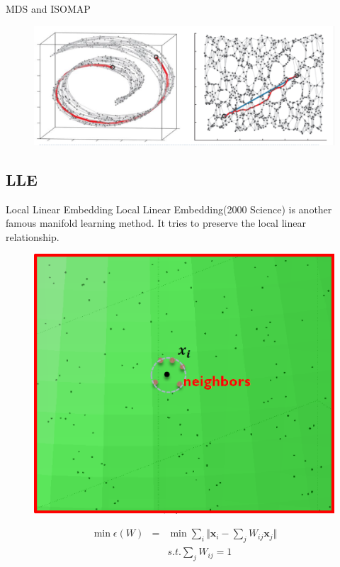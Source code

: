\documentclass{beamer}
\newcommand{\bol}[1]{\textbf{#1}}
\begin{document}
\begin{darkframes}
\begin{frame}{MDS and ISOMAP}
   	\begin{figure}
   	\centering
   	\includegraphics[scale=0.2]{./figs/fig6.eps}
   	\end{figure}
    \end{frame}
    
    \subsection{LLE}
    \begin{frame}{Local Linear Embedding}
    \alert{Local Linear Embedding}(2000 Science) is another famous manifold learning method. It tries to preserve the local linear relationship.
    \begin{figure}
    \centering
    \includegraphics[scale=0.2]{./figs/fig7.eps}
    \end{figure}
    \vspace{-5mm}
     \begin{eqnarray*}
    	\min\epsilon(W) & = & \min\sum_i\Vert \bol{x}_i - \sum_jW_{ij}\bol{x}_j \Vert \\
    							 &     & s.t. \sum_j W_{ij} = 1
    \end{eqnarray*}
    \end{frame}
    

\end{darkframes}
\end{document}
